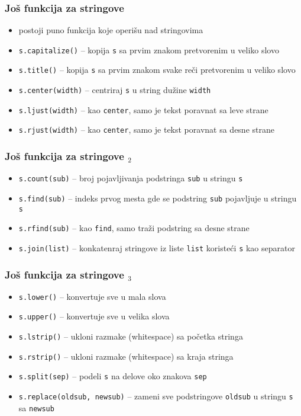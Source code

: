 \documentclass[utf8,compress,aspectratio=169]{beamer}
\begin{document}
\begin{frame}[fragile]
  \frametitle{Još funkcija za stringove}
  \begin{itemize}
    \item postoji puno funkcija koje operišu nad stringovima
    \item \texttt{s.capitalize()} -- kopija \texttt{s} sa prvim znakom pretvorenim u veliko slovo
    \item \texttt{s.title()} -- kopija \texttt{s} sa prvim znakom svake reči pretvorenim u veliko slovo
    \item \texttt{s.center(width)} -- centriraj \texttt{s} u string dužine \texttt{width}
    \item \texttt{s.ljust(width)} -- kao \texttt{center}, samo je tekst poravnat sa leve strane
    \item \texttt{s.rjust(width)} -- kao \texttt{center}, samo je tekst poravnat sa desne strane
  \end{itemize}
\end{frame}

\begin{frame}[fragile]
  \frametitle{Još funkcija za stringove $_2$}
  \begin{itemize}
    \item \texttt{s.count(sub)} -- broj pojavljivanja podstringa \texttt{sub} u stringu \texttt{s}
    \item \texttt{s.find(sub)} -- indeks prvog mesta gde se podstring \texttt{sub} pojavljuje u stringu \texttt{s}
    \item \texttt{s.rfind(sub)} -- kao \texttt{find}, samo traži podstring sa desne strane
    \item \texttt{s.join(list)} -- konkatenraj stringove iz liste \texttt{list} koristeći \texttt{s} kao separator
  \end{itemize}
\end{frame}

\begin{frame}[fragile]
  \frametitle{Još funkcija za stringove $_3$}
  \begin{itemize}
    \item \texttt{s.lower()} -- konvertuje sve u mala slova
    \item \texttt{s.upper()} -- konvertuje sve u velika slova
    \item \texttt{s.lstrip()} -- ukloni razmake (whitespace) sa početka stringa
    \item \texttt{s.rstrip()} -- ukloni razmake (whitespace) sa kraja stringa
    \item \texttt{s.split(sep)} -- podeli \texttt{s} na delove oko znakova \texttt{sep}
    \item \texttt{s.replace(oldsub, newsub)} -- zameni sve podstringove \texttt{oldsub} u stringu \texttt{s} sa \texttt{newsub}
  \end{itemize}
\end{frame}
\end{document}
